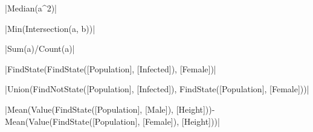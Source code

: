\documentclass[]{memoir}
\newcommand{\DecValTok}[1]{\textcolor[rgb]{0.25,0.63,0.44}{{#1}}}
\newcommand{\FunctionTok}[1]{\textcolor[rgb]{0.02,0.16,0.49}{{#1}}}
\newcommand{\NormalTok}[1]{{#1}}
\begin{document}
|\FunctionTok{Median}\NormalTok{(a^}\DecValTok{2}\NormalTok{)}|


|\FunctionTok{Min}\NormalTok{(}\FunctionTok{Intersection}\NormalTok{(a, b))}|


|\FunctionTok{Sum}\NormalTok{(a)/}\FunctionTok{Count}\NormalTok{(a)}|


|\FunctionTok{FindState}\NormalTok{(}\FunctionTok{FindState}\NormalTok{([Population], [Infected]), [Female])}|


|\FunctionTok{Union}\NormalTok{(}\FunctionTok{FindNotState}\NormalTok{([Population], [Infected]), }\FunctionTok{FindState}\NormalTok{([Population], [Female]))}|


|\FunctionTok{Mean}\NormalTok{(}\FunctionTok{Value}\NormalTok{(}\FunctionTok{FindState}\NormalTok{([Population], [Male]), [Height]))-}\FunctionTok{Mean}\NormalTok{(}\FunctionTok{Value}\NormalTok{(}\FunctionTok{FindState}\NormalTok{([Population], [Female]), [Height]))}|

\end{document}
